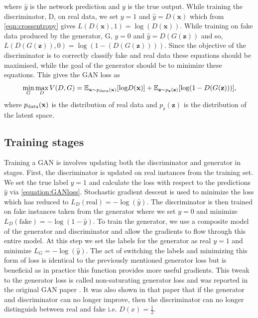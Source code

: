 \documentclass[12pt]{iopart}
\begin{document}
where $\hat{y}$ is the network prediction and $y$ is the true output. While training the discriminator, D, on real data, we set $y = 1$ and $\hat{y} = D(\mathbf{x})$ which from \cref{eqn:crossentropy} gives $L(D(\mathbf{x}),1) = \log(D(\mathbf{x}))$. While training on fake data produced by the generator, G, $y = 0$ and $\hat{y} = D(G(\mathbf{z}))$ and so, $L(D(G(\mathbf{z})),0) = \log(1-(D(G(\mathbf{z}))))$. Since the objective of the discriminator is to correctly classify fake and real data these equations should be maximised, while the goal of the generator should be to minimize these equations. This gives the \ac{GAN} loss as
%
\begin{equation}
   \mathop{\text{min}}_{G}  \mathop{\text{max}}_{D} V(D,G) = \mathbb{E}_{\mathbf{x} \sim p_{\text{\text{data}}}(\mathbf{x})} [\text{log} D(\mathbf{x})] + \mathbb{E}_{\mathbf{z} \sim p_{\mathbf{z}}(\mathbf{z})} [\text{log}(1-D(G(\mathbf{z})))],
 \label{equation:GANloss}
 \end{equation}
where $p_{\text{\text{data}}}(\mathbf{x})$ is the distribution of real data and $p_{\text{z}}(\mathbf{z})$ is the distribution of the latent space. 

\subsection{Training stages}
%
Training a GAN is involves updating both the discriminator and generator in stages. First, the discriminator is updated on real instances from the training set. We set the true label $y=1$ and calculate the loss with respect to the predictions $\hat{y}$ via \cref{equation:GANloss}. Stochastic gradient descent is used to minimize the loss which has reduced to $L_D(\textrm{real}) = -\log(\hat{y})$. The discriminator is then trained on fake instances taken from the generator where we set $y=0$ and minimize $L_D(\textrm{fake}) = -\log(1-\hat{y})$. To train the generator, we use a composite model of the generator and discriminator and allow the gradients to flow through this entire model. At this step we set the labels for the generator as real $y=1$ and minimize $L_G = -\log(\hat{y})$. The act of switching the labels and minimizing this form of loss is identical to the previously mentioned generator loss but is beneficial as in practice this function provides more useful gradients. This tweak to the generator loss is called non-saturating generator loss and was reported in the original GAN paper \cite{Goodfellow2014}. It was also shown in that paper that if the generator and discriminator can no longer improve, then the discriminator can no longer distinguish between real and fake i.e. $D(x) = \frac{1}{2}$. 
\end{document}
